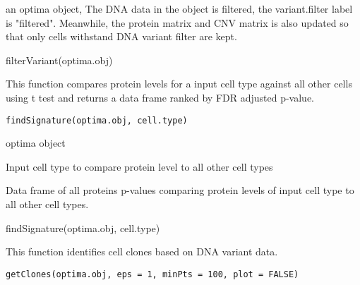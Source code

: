 \documentclass[a4paper]{book}
\begin{document}
%
\begin{Value}
an optima object, The DNA data in the object is filtered, the variant.filter label is "filtered".
Meanwhile, the protein matrix and CNV matrix is also updated so that only cells withstand DNA variant filter are kept.
\end{Value}
%
\begin{Examples}
\begin{ExampleCode}
filterVariant(optima.obj)
\end{ExampleCode}
\end{Examples}
%
\begin{Description}\relax
This function compares protein levels for a input cell type against all other
cells using t test and returns a data frame ranked by
FDR adjusted p-value.
\end{Description}
%
\begin{Usage}
\begin{verbatim}
findSignature(optima.obj, cell.type)
\end{verbatim}
\end{Usage}
%
\begin{Arguments}
\begin{ldescription}
\item[\code{optima.obj}] optima object

\item[\code{cell.type}] Input cell type to compare protein level to all other cell types
\end{ldescription}
\end{Arguments}
%
\begin{Value}
Data frame of all proteins p-values comparing protein levels of input
cell type to all other cell types.
\end{Value}
%
\begin{Examples}
\begin{ExampleCode}
findSignature(optima.obj, cell.type)
\end{ExampleCode}
\end{Examples}
%
\begin{Description}\relax
This function identifies cell clones based on DNA variant data.
\end{Description}
%
\begin{Usage}
\begin{verbatim}
getClones(optima.obj, eps = 1, minPts = 100, plot = FALSE)
\end{verbatim}
\end{Usage}
\end{document}
